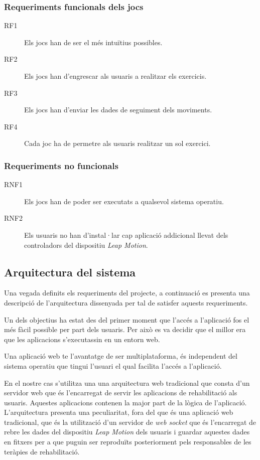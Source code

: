 \documentclass[12pt,a4paper,catalan]{article}
\begin{document}
	\subsubsection*{Requeriments funcionals dels jocs}
	\begin{description}
		\item [RF1] Els jocs han de ser el més intuïtius possibles.
		\item [RF2] Els jocs han d'engrescar als usuaris a realitzar els exercicis.
		\item [RF3] Els jocs han d'enviar les dades de seguiment dels moviments.
		\item [RF4] Cada joc ha de permetre als usuaris realitzar un sol exercici.
	\end{description}
	\subsubsection*{Requeriments no funcionals}
	\begin{description}
		\item [RNF1] Els jocs han de poder ser executats a qualsevol sistema operatiu.
		\item [RNF2] Els usuaris no han d'instal·lar cap aplicació addicional llevat dels controladors del dispositiu \textit{Leap Motion}.
	\end{description}
	\subsection{Arquitectura del sistema}
	Una vegada definits els requeriments del projecte, a continuació es presenta una descripció de l'arquitectura dissenyada per tal de satisfer aquests requeriments.
	
	Un dels objectius ha estat des del primer moment que l'accés a l'aplicació fos el més fàcil possible per part dels usuaris. Per això es va decidir que el millor era que les aplicacions s'executassin en un entorn web.
	
	Una aplicació web te l'avantatge de ser multiplataforma, és independent del sistema operatiu que tingui l'usuari el qual facilita l'accés a l'aplicació.
	
	En el nostre cas s'utilitza una una arquitectura web tradicional que consta d'un servidor web que és l'encarregat de servir les aplicacions de rehabilitació als usuaris. Aquestes aplicacions contenen la major part de la lògica de l'aplicació. L'arquitectura presenta una peculiaritat, fora del que és una aplicació web tradicional, que és la utilització d'un servidor de \textit{web socket} que és l'encarregat de rebre les dades del dispositiu \textit{Leap Motion} dels usuaris i guardar aquestes dades en fitxers per a que puguin ser reproduïts posteriorment pels responsables de les teràpies de rehabilitació.\\
	
\end{document}
